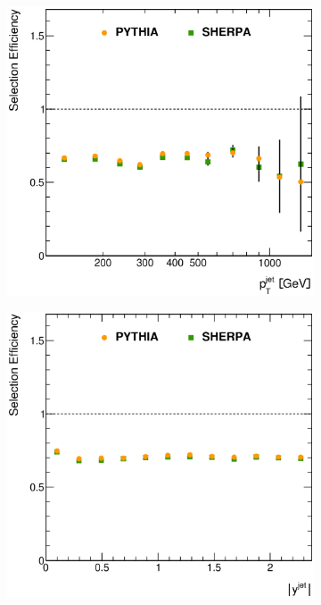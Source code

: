 \documentclass[12pt, twoside]{article}
\numberwithin{equation}{section}
\numberwithin{figure}{section}
\newenvironment{changemargin}[2]{%
\begin{list}{}{%
\setlength{\topsep}{0pt}%
\setlength{\leftmargin}{#1}%
\setlength{\rightmargin}{#2}%
\setlength{\listparindent}{\parindent}%
\setlength{\itemindent}{\parindent}%
\setlength{\parsep}{\parskip}%
}%
\item[]}{\end{list}}
\begin{document}
\begin{figure}
\begin{changemargin}{-1.0cm}{-0.75cm}
\begin{changemargin}{-0.75cm}{-1.0cm}
        \vspace{0.2cm}
        \begin{subfigure}[b]{0.37\textwidth}
            \includegraphics[width=\textwidth]{./images/SelectionEfficiencies/EFF-104.eps}
            \subcaption{}
            \label{fig:SelectionEfficienciesPtJet}
        \end{subfigure}
        \begin{subfigure}[b]{0.37\textwidth}
            \includegraphics[width=\textwidth]{./images/SelectionEfficiencies/EFF-105.eps}

\end{subfigure}
\end{changemargin}
\end{changemargin}
\end{figure}
\end{document}

